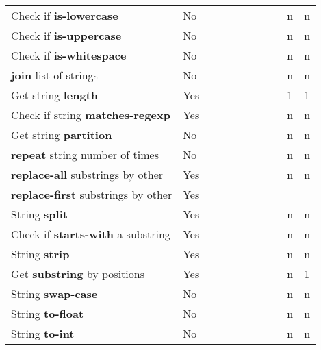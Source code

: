 \documentclass[anonymous,sigplan,review,11pt,nonacm,natbib=false]{acmart}
\begin{document}
\begin{longtable}{lllllllllll}
        Check if \textbf{is-lowercase} & No &  &  &  &  & &  &  & n & n \\

        Check if \textbf{is-uppercase} & No &  &  &  &  & &  &  & n & n \\

        Check if \textbf{is-whitespace} & No &  &  &  &  & &  &  & n & n \\

        \textbf{join} list of strings & No &  &  &  &  & &  &  & n & n \\

        Get string \textbf{length} & Yes &  &  &  &  & &  &  & 1 & 1 \\

        Check if string \textbf{matches-regexp} & Yes &  &  &  &  & &  &  & n & n \\

        Get string \textbf{partition} & No &  &  &  &  & &  &  & n & n \\

        \textbf{repeat} string number of times & No &  &  &  &  & &  &  & n & n \\

        \textbf{replace-all} substrings by other & Yes &  &  &  &  & &  &  & n & n \\

        \textbf{replace-first} substrings by other & Yes &  &  &  &  &  &  &  &  & \\

        String \textbf{split} & Yes &  &  &  &  & &  &  & n & n \\

        Check if \textbf{starts-with} a substring & Yes &  &  &  &  & &  &  & n & n \\

        String \textbf{strip} & Yes &  &  &  &  & &  &  & n & n \\

        Get \textbf{substring} by positions & Yes &  &  &  &  & &  &  & n & 1 \\

        String \textbf{swap-case} & No &  &  &  &  & &  &  & n & n \\

        String \textbf{to-float} & No &  &  &  &  & &  &  & n & n \\

        String \textbf{to-int} & No &  &  &  &  & &  &  & n & n \\


\end{longtable}
\end{document}
